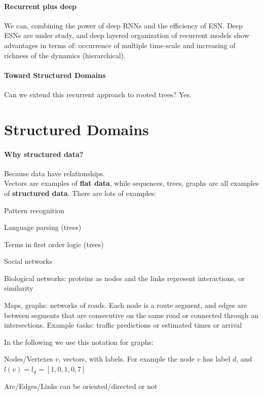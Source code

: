 \documentclass[10pt]{report}
\begin{document}
\paragraph{Recurrent plus deep} We can, combining the power of deep RNNs and the efficiency of ESN. Deep ESNs are under study, and deep layered organization of recurrent models show advantages in terms of: occurrence of multiple time-scale and increasing of richness of the dynamics (hierarchical).
\paragraph{Toward Structured Domains} Can we extend this recurrent approach to rooted trees? Yes.
\section{Structured Domains}
\paragraph{Why structured data?} Because data have relationships.\\
Vectors are examples of \textbf{flat data}, while sequences, trees, graphs are all examples of \textbf{structured data}. There are lots of examples:
\begin{list}{}{}
	\item Pattern recognition
	\item Language parsing (trees)
	\item Terms in first order logic (trees)
	\item Social networks
	\item Biological networks: proteins as nodes and the links represent interactions, or similarity
	\item Maps, graphs: networks of roads. Each node is a route segment, and edges are between segments that are consecutive on the same road or connected through an intersections. Example tasks: traffic predictions or estimated times or arrival
\end{list}
In the following we use this notation for graphs:
\begin{list}{}{}
	\item Nodes/Vertexes $v$, vectors, with labels. For example the node $v$ has label $d$, and $l(v) = l_d = [1,0,1,0,7]$
	\item Arc/Edges/Links can be oriented/directed or not
\end{list}
\end{document}
